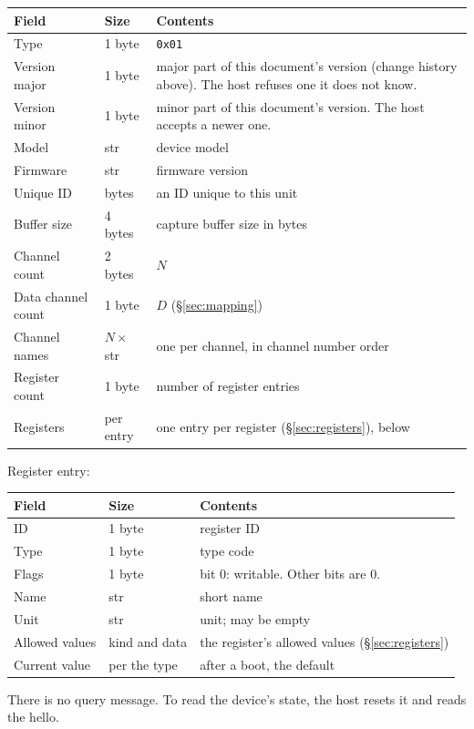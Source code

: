 \documentclass[11pt,a4paper]{article}
\newcommand{\sref}[1]{\S\ref{#1}}
\newcommand{\hex}[1]{\texttt{#1}}
\begin{document}
\begin{tabularx}{\linewidth}{@{}l l L@{}}
\toprule
\textbf{Field} & \textbf{Size} & \textbf{Contents} \\
\midrule
Type & 1 byte & \hex{0x01} \\
Version major & 1 byte & major part of this document's version (change history above). The host refuses one it does not know. \\
Version minor & 1 byte & minor part of this document's version. The host accepts a newer one. \\
Model & str & device model \\
Firmware & str & firmware version \\
Unique ID & bytes & an ID unique to this unit \\
Buffer size & 4 bytes & capture buffer size in bytes \\
Channel count & 2 bytes & $N$ \\
Data channel count & 1 byte & $D$ (\sref{sec:mapping}) \\
Channel names & $N \times$ str & one per channel, in channel number order \\
Register count & 1 byte & number of register entries \\
Registers & per entry & one entry per register (\sref{sec:registers}), below \\
\bottomrule
\end{tabularx}

\medskip

Register entry:

\begin{tabularx}{\linewidth}{@{}l l L@{}}
\toprule
\textbf{Field} & \textbf{Size} & \textbf{Contents} \\
\midrule
ID & 1 byte & register ID \\
Type & 1 byte & type code \\
Flags & 1 byte & bit 0: writable. Other bits are 0. \\
Name & str & short name \\
Unit & str & unit; may be empty \\
Allowed values & kind and data & the register's allowed values (\sref{sec:registers}) \\
Current value & per the type & after a boot, the default \\
\bottomrule
\end{tabularx}

There is no query message. To read the device's state, the host resets it and reads the
hello.
\end{document}
